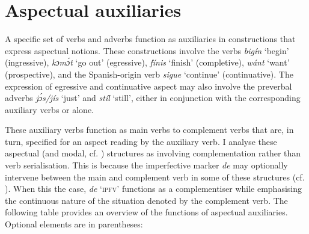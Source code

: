 \ea%
    \label{ex:key:348}
\z
\z

\section{Aspectual auxiliaries}\label{sec:6.4}
A specific set of verbs and adverbs function as auxiliaries in constructions that express aspectual notions. These constructions involve the verbs \textit{bigín} ‘begin’ (ingressive), \textit{kɔmɔ́t} ‘go out’ (egressive), \textit{fínis} ‘finish’\textit{} (completive), \textit{wánt} ‘want’ (prospective), and the Spanish-origin verb \textit{sigue} ‘continue’ (continuative). The expression of egressive and continuative aspect may also involve the preverbal adverbs \textit{jɔ́s/jís} ‘just’ and \textit{stíl} ‘still’, either in conjunction with the corresponding auxiliary verbs or alone. 


These auxiliary verbs function as main verbs to complement verbs that are, in turn, specified for an aspect reading by the auxiliary verb. I analyse these aspectual (and modal, cf. ) structures as involving complementation rather than verb serialisation. This is because the imperfective marker \textit{de} may optionally intervene between the main and complement verb in some of these structures (cf. ). When this the case, \textit{de} \textsc{‘ipfv’} functions as a complementiser while emphasising the continuous nature of the situation denoted by the complement verb. The following table provides an overview of the functions of aspectual auxiliaries. Optional elements are in parentheses: 


